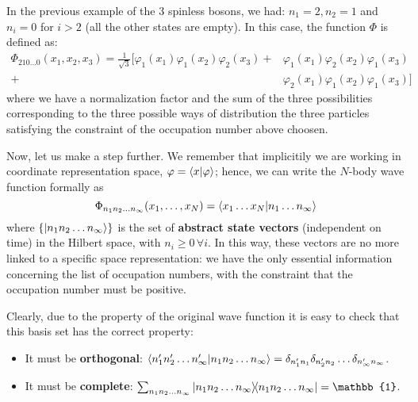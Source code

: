 \documentclass[../main/main.tex]{subfiles}
\begin{document}
\begin{example}{}{}
In the previous example of the 3 spinless bosons, we had: \( n_1 = 2, n_2=1 \) and \( n_i=0 \) for \( i>2 \) (all the other states are empty). In this case, the function \( \Phi  \) is defined as:
\begin{equation*}
\begin{split}
  \Phi _{210 \dots 0} (x_1,x_2,x_3) = \frac{1}{\sqrt{3} } \Big[ \varphi _1 (x_1)\varphi _1 (x_2) \varphi _2 (x_3) +
  & \varphi _1 (x_1)\varphi _2 (x_2) \varphi _1 (x_3)  \\
  + & \varphi _2 (x_1)\varphi _1 (x_2) \varphi _1 (x_3) \Big]
\end{split}
\end{equation*}
where we have a normalization factor and the sum of the three possibilities corresponding to the three possible ways of distribution the three particles satisfying the constraint of the occupation number above choosen.
\end{example}

Now, let us make a step further. We remember that implicitily we are working in coordinate representation space, \( \varphi = \braket{x}{\varphi } \); hence, we can write the \( N \)-body  wave function formally as
\begin{equation*}
\Phi _{n_1 n_2 \dots n_ \infty } (x_1, \dots, x_N) = \braket{x_1 \dots x_N}{n_1 \dots n_\infty}
\end{equation*}
where \( \{ \ket{n_1 n_2 \dots n_ \infty }  \}   \) is the set of \textbf{abstract state vectors} (independent on time) in the Hilbert space, with \( n_i \ge 0 \, \forall i \).   In this way, these vectors are no more linked to a specific space representation: we have the only essential information concerning the list of occupation numbers, with the constraint that the occupation number must be positive.

Clearly, due to the property of the original wave function it is easy to check that this basis set has the correct property:
\begin{itemize}
\item It must be \textbf{orthogonal}: \( \braket{n_1' n_2' \dots n_ \infty '}{n_1 n_2 \dots n_ \infty  } = \delta _{n_1' n_1} \delta_{n_2' n_2} \dots \delta _{n_ \infty ' n _ \infty } \).
\item It must be \textbf{complete}: \( \sum_{n_1 n_2 \dots n_ \infty }^{} \ketbra{n_1 n_2 \dots n_ \infty }{n_1 n_2 \dots n_ \infty }  = \mathbb{1}  \).
\end{itemize}
\end{document}
